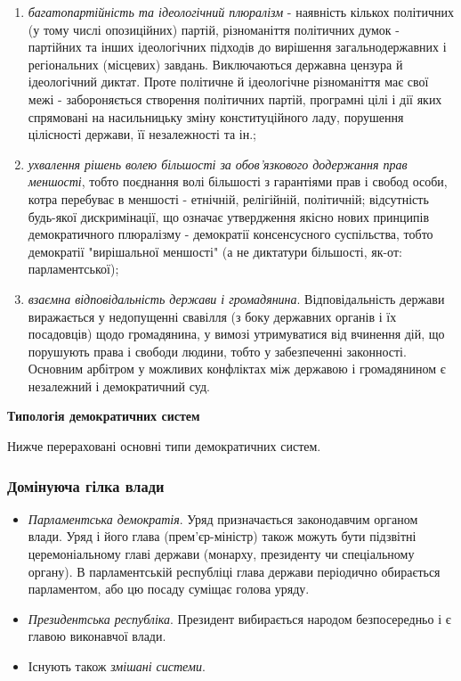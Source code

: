 \begin{enumerate}
\item \textit{багатопартійність та ідеологічний плюралізм} - наявність кількох політичних (у тому числі опозиційних) партій, різноманіття політичних думок - партійних та інших ідеологічних підходів до вирішення загальнодержавних і регіональних (місцевих) завдань. Виключаються державна цензура й ідеологічний диктат. Проте політичне й ідеологічне різноманіття має свої межі - забороняється створення політичних партій, програмні цілі і дії яких спрямовані на насильницьку зміну конституційного ладу, порушення цілісності держави, її незалежності та ін.;
\item \textit{ухвалення рішень волею більшості за обов'язкового додержання прав меншості}, тобто поєднання волі більшості з гарантіями прав і свобод особи, котра перебуває в меншості - етнічній, релігійній, політичній; відсутність будь-якої дискримінації, що означає утвердження якісно нових принципів демократичного плюралізму - демократії консенсусного суспільства, тобто демократії "вирішальної меншості" (а не диктатури більшості, як-от: парламентської);
\item \textit{взаємна відповідальність держави і громадянина}. Відповідальність держави виражається у недопущенні свавілля (з боку державних органів і їх посадовців) щодо громадянина, у вимозі утримуватися від вчинення дій, що порушують права і свободи людини, тобто у забезпеченні законності. Основним арбітром у можливих конфліктах між державою і громадянином є незалежний і демократичний суд.
\end{enumerate}
\noindent\textbf{Типологія демократичних систем}

Нижче перераховані основні типи демократичних систем.
\subsubsection{Домінуюча гілка влади}
\begin{itemize}
\item \textit{Парламентська демократія}. Уряд призначається законодавчим органом влади. Уряд і його глава (прем'єр-міністр) також можуть бути підзвітні церемоніальному главі держави (монарху, президенту чи спеціальному органу). В парламентській республіці глава держави періодично обирається парламентом, або цю посаду суміщає голова уряду.
\item \textit{Президентська республіка}. Президент вибирається народом безпосередньо і є главою виконавчої влади.
\item Існують також \textit{змішані системи}.
\end{itemize}
